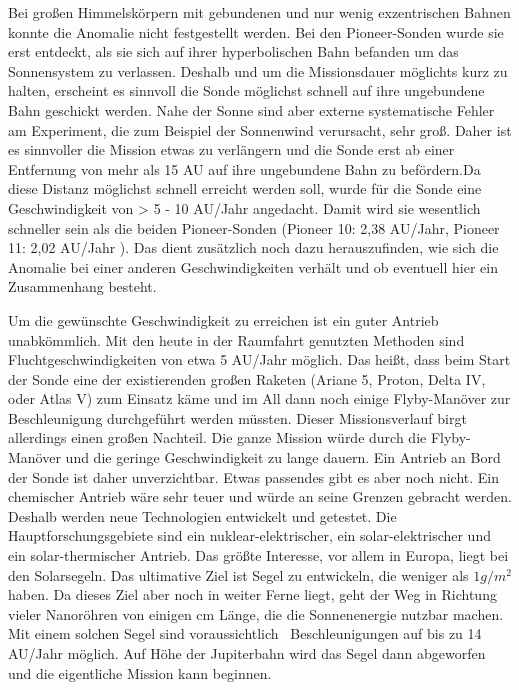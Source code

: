 Bei gro{\ss}en Himmelsk\"orpern mit gebundenen und nur wenig
exzentrischen Bahnen konnte die Anomalie nicht festgestellt werden. 
Bei den Pioneer-Sonden wurde sie erst ent\-deckt, als sie sich auf
ihrer hyperbolischen Bahn befanden um das Sonnensystem zu ver\-lassen.
Deshalb und um die Missionsdauer möglichts kurz zu halten, erscheint es sinnvoll 
die Sonde möglichst schnell auf ihre ungebundene Bahn geschickt werden.
Nahe der Sonne sind aber externe systematische Fehler am Experiment, die zum Beispiel 
der Sonnenwind verursacht, sehr groß. Daher ist es sinnvoller die 
Mission etwas zu verlängern und die Sonde erst ab einer Entfernung von mehr als 15
AU auf ihre ungebundene Bahn zu befördern.Da diese Distanz
m\"oglichst schnell erreicht werden soll, wurde f\"ur die Sonde eine
Ge\-schwindigkeit von {\textgreater} 5 - 10 AU/Jahr angedacht. Damit
wird sie wesentlich schneller sein als die beiden Pioneer-Sonden
(Pioneer 10: 2,38 AU/Jahr, Pioneer 11: 2,02 AU/Jahr ). Das dient
zus\"atzlich noch dazu herauszufinden, wie sich die Anomalie bei einer
anderen Ge\-schwindigkeiten verh\"alt und ob eventuell hier ein
Zusammenhang besteht.




Um die gew\"unschte Geschwindigkeit zu erreichen ist ein guter
Antrieb unabk\"ommlich. Mit den heute in der Raumfahrt genutzten
Methoden sind Fluchtgeschwindigkeiten von etwa 5 AU/Jahr m\"oglich. Das
hei{\ss}t, dass beim Start der Sonde eine der existierenden gro{\ss}en
Raketen (Ariane 5, Proton, Delta IV, oder Atlas V) zum Einsatz k\"ame
und im All dann noch einige Flyby-Man\"over zur Beschleunigung
durchgef\"uhrt werden m\"ussten. Die\-ser Missionsverlauf birgt
allerdings einen gro{\ss}en Nachteil. Die ganze Mission w\"urde durch
die Flyby-Man\"over und die geringe Geschwindigkeit zu lange dauern.
Ein Antrieb an Bord der Sonde ist daher unverzichtbar. Etwas passendes
gibt es aber noch nicht. Ein chemischer Antrieb w\"are sehr teuer und
w\"urde an seine Grenzen gebracht werden. Des\-halb werden neue
Technologien entwickelt und getestet. Die Hauptforschungsgebiete sind
ein nuklear-elektrischer, ein solar-elektrischer und ein
solar-thermischer Antrieb. Das gr\"o{\ss}te Interesse, vor allem in
Europa, liegt bei den Solarsegeln. Das ultimative Ziel ist Se\-gel zu
entwickeln, die weniger als $1g/m^{2}$ haben. Da dieses Ziel aber noch
in weiter Fer\-ne liegt, geht der Weg in Richtung vieler Nanor\"ohren
von einigen cm L\"ange, die die Son\-nenenergie nutzbar machen. Mit
einem solchen Segel sind voraussichtlich \ Beschleunigun\-gen auf bis
zu 14 AU/Jahr m\"oglich. Auf H\"ohe der Jupiterbahn wird das Segel dann
abge\-worfen und die eigentliche Mission kann beginnen.




